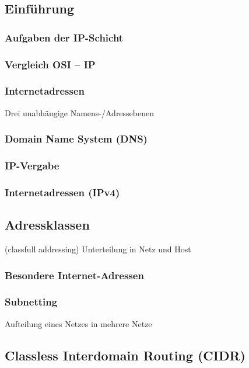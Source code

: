 \subsection{Einführung}
\subsubsection{Aufgaben der IP-Schicht}
\subsubsection{Vergleich OSI -- IP}
\subsubsection{Internetadressen}
Drei unabhängige Namens-/Adressebenen
\subsubsection{Domain Name System (DNS)}

\subsubsection{IP-Vergabe}

\subsubsection{Internetadressen (IPv4)}
\subsection{Adressklassen}
(classfull addressing) Unterteilung in Netz und Host

\subsubsection{Besondere Internet-Adressen}
\subsubsection{Subnetting}
Aufteilung eines Netzes in mehrere Netze
\subsection{Classless Interdomain Routing (CIDR)}
